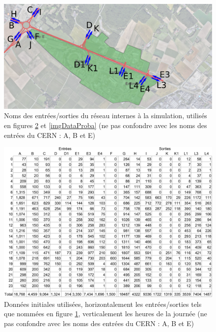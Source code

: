\documentclass[a4paper,11pt, titlepage]{extarticle}
\begin{document}
\begin{figure}[!h]
  \begin{center}
    \includegraphics[width=13cm]{images/reseauNoms.png}
  \end{center}
  \caption{Noms des entrées/sorties du réseau internes à la simulation, utilisés en figures \ref{imgData} et \ref{imgDataProba} (ne pas confondre avec les noms des entrées du CERN : A, B et E)}
  \label{imgNomsIO}
\end{figure}

\begin{figure}[!h]
  \begin{center}
    \includegraphics[width=16cm]{images/donneesInitiales.png}
  \end{center}
  \caption{Données initiales utilisées, horizontalement les entrées/sorties tels que nommées en figure \ref{imgNomsIO}, verticalement les heures de la journée (ne pas confondre avec les noms des entrées du CERN : A, B et E)}
  \label{imgData}
\end{figure}
\end{document}
